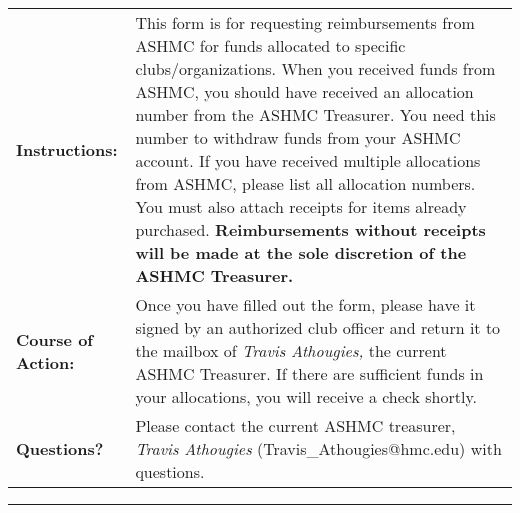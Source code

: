\documentclass{article}
\makeatletter
\newcommand{\treasurername}{Travis Athougies}
\newcommand{\treasureremail}{Travis\_Athougies@hmc.edu}
\makeatother
\begin{document}
\sffamily
\begin{tabular}{lp{}}
  \textbf{Instructions:} & This form is for requesting reimbursements from ASHMC for funds
  allocated to specific clubs/organizations. When you received funds from ASHMC, you should have
  received an allocation number from the ASHMC Treasurer. You need this number to withdraw
  funds from your ASHMC account. If you have received multiple allocations from ASHMC, please list all
  allocation numbers. You must also attach receipts for items already purchased. \textbf{Reimbursements without receipts will be made at the sole
    discretion of the ASHMC Treasurer.} \\
  \textbf{Course of Action:} & Once you have filled out the form, please have it signed by an
  authorized club officer and return it to the mailbox of
  \emph{Travis Athougies,} the current ASHMC Treasurer. If there are sufficient funds in your
  allocations, you will receive a check shortly. \\
  \textbf{Questions?} & Please contact the current ASHMC treasurer, \emph{\treasurername}
  (\treasureremail) with questions.
\end{tabular}

\vspace{1em}
\rule{0.97\textwidth}{1pt}
\vspace{1em}
\end{document}
